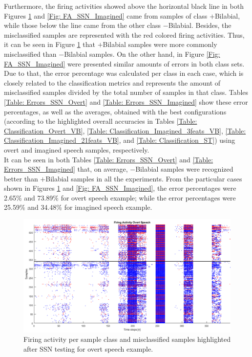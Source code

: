 Furthermore, the firing activities showed above the horizontal black line in both Figures \ref{Fig: FA_SSN_Overt} and \ref{Fig: FA_SSN_Imagined} came from samples of class $+$Bilabial, while those below the line came from the other class $-$Bilabial. Besides, the misclassified samples are represented with the red colored firing activities. Thus, it can be seen in Figure \ref{Fig: FA_SSN_Overt} that $+$Bilabial samples were more commonly misclassified than $-$Bilabial samples. On the other hand, in Figure \ref{Fig: FA_SSN_Imagined} were presented similar amounts of errors in both class sets.\\

Due to that, the error percentage was calculated per class in each case,  which is closely related to the classification metrics and represents the amount of misclassified samples divided by the total number of samples in that class. Tables \ref{Table: Errors_SSN_Overt} and \ref{Table: Errors_SSN_Imagined} show these error percentages, as well as the averages, obtained with the best configurations (according to the highlighted overall accuracies in Tables \ref{Table: Classification_Overt_VB}, \ref{Table: Classification_Imagined_3feats_VB}, \ref{Table: Classification_Imagined_21feats_VB}, and \ref{Table: Classification_ST}) using overt and imagined speech samples, respectively.\\

It can be seen in both Tables \ref{Table: Errors_SSN_Overt} and \ref{Table: Errors_SSN_Imagined} that, on average, $-$Bilabial samples were recognized better than $+$Bilabial samples in all the experiments. From the particular cases shown in Figures \ref{Fig: FA_SSN_Overt} and \ref{Fig: FA_SSN_Imagined}, the error percentages were 2.65\% and 73.89\% for overt speech example; while the error percentages were 25.59\% and 34.48\% for imagined speech example.\\

\begin{figure}[h!]
	\centering
	\includegraphics[width=\linewidth]{Figures/FA_SSN_Overt.png}
	\caption{Firing activity per sample class and misclassified samples highlighted after SSN testing for overt speech example.}
	\label{Fig: FA_SSN_Overt}
\end{figure}

